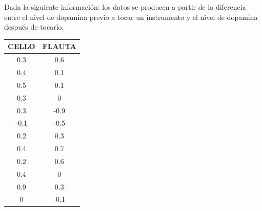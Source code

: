 Dada la siguiente información: los datos se producen a partir de la diferencia entre el nivel de dopamina previo a tocar un instrumento y el nivel de dopamina después de tocarlo.
\begin{center}
    \begin{tabular}{ |cc| }
        \hline
        CELLO & FLAUTA \\
        \hline
        0.3 & 0.6 \\
        0.4 & 0.1 \\
        0.5 & 0.1 \\
        0.3 & 0 \\
        0.3 & -0.9 \\
        -0.1 & -0.5 \\
        0.2 & 0.3 \\
        0.4 & 0.7 \\
        0.2 & 0.6 \\
        0.4 & 0 \\
        0.9 & 0.3 \\
        0 & -0.1 \\
        \hline
    \end{tabular}
\end{center}


